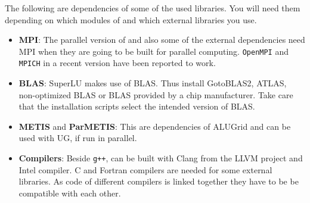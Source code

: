 The following are dependencies of some of the used libraries. You will need them
depending on which modules of \Dune and which external libraries you use.

\begin{itemize}
\item \textbf{MPI}: The parallel version of \Dune and also some of the external dependencies need MPI
  when they are going to be built for parallel computing. \texttt{OpenMPI} and \texttt{MPICH} in a recent
  version have been reported to work.

\item \textbf{BLAS}: SuperLU makes use of BLAS. Thus install GotoBLAS2, ATLAS, non-optimized BLAS
  or BLAS provided by a chip manufacturer. Take care that the installation scripts select the intended
  version of BLAS.

\item \textbf{METIS} and \textbf{ParMETIS}: This are dependencies of ALUGrid and can be used with UG, if run in parallel.

\item \textbf{Compilers}: Beside \texttt{g++}, \Dune can be built with Clang from the LLVM project and
  Intel \Cplusplus compiler. C and Fortran compilers are needed for some external libraries. As code of
  different compilers is linked together they have to be be compatible with each other.
\end{itemize}
